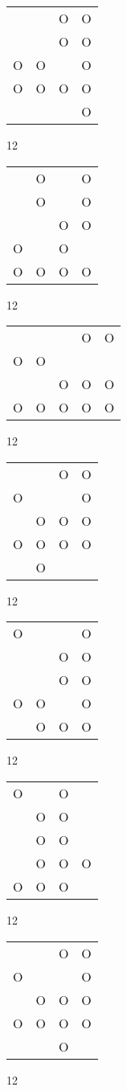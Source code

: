 \begin{tabular}{|m{0.2cm}m{0.2cm}m{0.2cm}m{0.2cm}|}\hline
 & &O&O\\
 & &O&O\\
O&O& &O\\
O&O&O&O\\
 & & &O\\
\hline\end{tabular}12
\begin{tabular}{|m{0.2cm}m{0.2cm}m{0.2cm}m{0.2cm}|}\hline
 &O& &O\\
 &O& &O\\
 & &O&O\\
O& &O& \\
O&O&O&O\\
\hline\end{tabular}12
\begin{tabular}{|m{0.2cm}m{0.2cm}m{0.2cm}m{0.2cm}m{0.2cm}|}\hline
 & & &O&O\\
O&O& & & \\
 & &O&O&O\\
O&O&O&O&O\\
\hline\end{tabular}12
\begin{tabular}{|m{0.2cm}m{0.2cm}m{0.2cm}m{0.2cm}|}\hline
 & &O&O\\
O& & &O\\
 &O&O&O\\
O&O&O&O\\
 &O& & \\
\hline\end{tabular}12
\begin{tabular}{|m{0.2cm}m{0.2cm}m{0.2cm}m{0.2cm}|}\hline
O& & &O\\
 & &O&O\\
 & &O&O\\
O&O& &O\\
 &O&O&O\\
\hline\end{tabular}12
\begin{tabular}{|m{0.2cm}m{0.2cm}m{0.2cm}m{0.2cm}|}\hline
O& &O& \\
 &O&O& \\
 &O&O& \\
 &O&O&O\\
O&O&O& \\
\hline\end{tabular}12
\begin{tabular}{|m{0.2cm}m{0.2cm}m{0.2cm}m{0.2cm}|}\hline
 & &O&O\\
O& & &O\\
 &O&O&O\\
O&O&O&O\\
 & &O& \\
\hline\end{tabular}12
